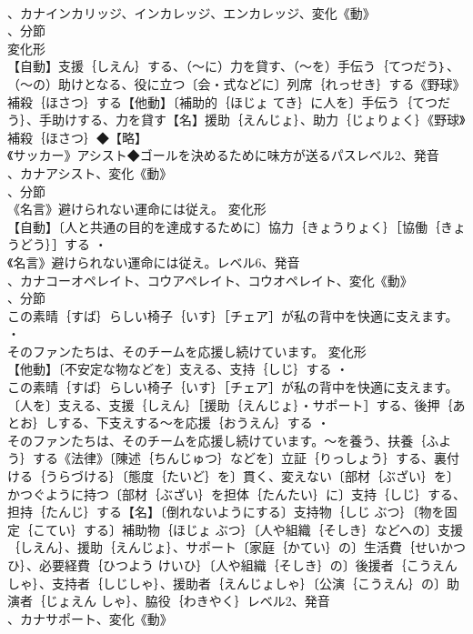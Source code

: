 \documentclass[8pt]{extreport}
\begin{document}
\begin{CJK}{UTF8}{min}
\\	、カナインカリッジ、インカレッジ、エンカレッジ、変化《動》
\\	、分節
\\	変化形 
\\	【自動】支援｛しえん｝する、（～に）力を貸す、（～を）手伝う｛てつだう｝、（～の）助けとなる、役に立つ〔会・式などに〕列席｛れっせき｝する《野球》補殺｛ほさつ｝する【他動】〔補助的｛ほじょ てき｝に人を〕手伝う｛てつだう｝、手助けする、力を貸す【名】援助｛えんじょ｝、助力｛じょりょく｝《野球》補殺｛ほさつ｝◆【略】
\\	《サッカー》アシスト◆ゴールを決めるために味方が送るパスレベル2、発音
\\	、カナアシスト、変化《動》
\\	、分節
\\	《名言》避けられない運命には従え。	変化形 
\\	【自動】〔人と共通の目的を達成するために〕協力｛きょうりょく｝［協働｛きょうどう｝］する ・
\\	《名言》避けられない運命には従え。レベル6、発音
\\	、カナコーオペレイト、コウアペレイト、コウオペレイト、変化《動》
\\	、分節
\\	この素晴｛すば｝らしい椅子｛いす｝［チェア］が私の背中を快適に支えます。 ・
\\	そのファンたちは、そのチームを応援し続けています。	変化形 
\\	【他動】〔不安定な物などを〕支える、支持｛しじ｝する ・
\\	この素晴｛すば｝らしい椅子｛いす｝［チェア］が私の背中を快適に支えます。〔人を〕支える、支援｛しえん｝［援助｛えんじょ｝・サポート］する、後押｛あとお｝しする、下支えする～を応援｛おうえん｝する ・
\\	そのファンたちは、そのチームを応援し続けています。～を養う、扶養｛ふよう｝する《法律》〔陳述｛ちんじゅつ｝などを〕立証｛りっしょう｝する、裏付ける｛うらづける｝〔態度｛たいど｝を〕貫く、変えない〔部材｛ぶざい｝を〕かつぐように持つ〔部材｛ぶざい｝を担体｛たんたい｝に〕支持｛しじ｝する、担持｛たんじ｝する【名】〔倒れないようにする〕支持物｛しじ ぶつ｝〔物を固定｛こてい｝する〕補助物｛ほじょ ぶつ｝〔人や組織｛そしき｝などへの〕支援｛しえん｝、援助｛えんじょ｝、サポート〔家庭｛かてい｝の〕生活費｛せいかつひ｝、必要経費｛ひつよう けいひ｝〔人や組織｛そしき｝の〕後援者｛こうえんしゃ｝、支持者｛しじしゃ｝、援助者｛えんじょしゃ｝〔公演｛こうえん｝の〕助演者｛じょえん しゃ｝、脇役｛わきやく｝レベル2、発音
\\	、カナサポート、変化《動》

\end{CJK}
\end{document}
